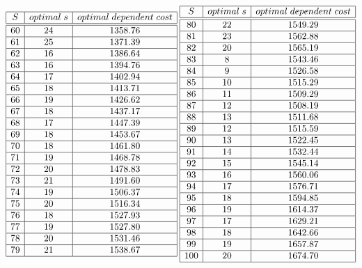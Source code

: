 \documentclass[11pt]{article} %
\begin{document}
\begin{enumerate}
\begin{enumerate}
$\begin{array}{|c|c|c|}\hline
S & optimal\;s & optimal\;dependent\;cost\\\hline\hline
60 & 24 & 1358.76\\\hline
61 & 25 & 1371.39\\\hline
62 & 16 & 1386.64\\\hline
63 & 16 & 1394.76\\\hline
64 & 17 & 1402.94\\\hline
65 & 18 & 1413.71\\\hline
66 & 19 & 1426.62\\\hline
67 & 18 & 1437.17\\\hline
68 & 17 & 1447.39\\\hline
69 & 18 & 1453.67\\\hline
70 & 18 & 1461.80\\\hline
71 & 19 & 1468.78\\\hline
72 & 20 & 1478.83\\\hline
73 & 21 & 1491.60\\\hline
74 & 19 & 1506.37\\\hline
75 & 20 & 1516.34\\\hline
76 & 18 & 1527.93\\\hline
77 & 19 & 1527.80\\\hline
78 & 20 & 1531.46\\\hline
79 & 21 & 1538.67\\\hline
\end{array}\;
\begin{array}{|c|c|c|}\hline
S & optimal\;s & optimal\;dependent\;cost\\\hline\hline
80 & 22 & 1549.29\\\hline
81 & 23 & 1562.88\\\hline
82 & 20 & 1565.19\\\hline
83 & 8 & 1543.46\\\hline
84 & 9 & 1526.58\\\hline
85 & 10 & 1515.29\\\hline
86 & 11 & 1509.29\\\hline
87 & 12 & 1508.19\\\hline
88 & 13 & 1511.68\\\hline
89 & 12 & 1515.59\\\hline
90 & 13 & 1522.45\\\hline
91 & 14 & 1532.44\\\hline
92 & 15 & 1545.14\\\hline
93 & 16 & 1560.06\\\hline
94 & 17 & 1576.71\\\hline
95 & 18 & 1594.85\\\hline
96 & 19 & 1614.37\\\hline
97 & 17 & 1629.21\\\hline
98 & 18 & 1642.66\\\hline
99 & 19 & 1657.87\\\hline
100 & 20 & 1674.70\\\hline
\end{array}$


\end{enumerate}
\end{enumerate}
\end{document}
